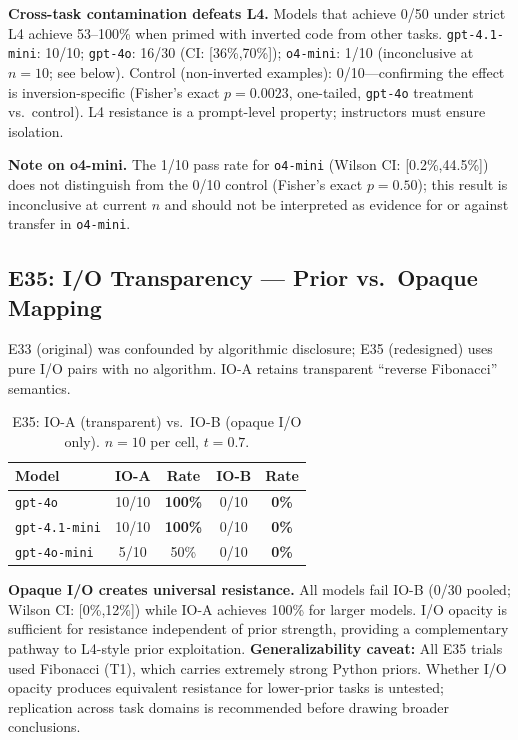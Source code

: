 \textbf{Cross-task contamination defeats L4.} Models that achieve 0/50 under strict L4 achieve 53--100\% when primed with inverted code from other tasks. \texttt{gpt-4.1-mini}: 10/10; \texttt{gpt-4o}: 16/30 (CI: [36\%,70\%]); \texttt{o4-mini}: 1/10 (inconclusive at $n=10$; see below). Control (non-inverted examples): 0/10---confirming the effect is inversion-specific (Fisher's exact $p=0.0023$, one-tailed, \texttt{gpt-4o} treatment vs.\ control). L4 resistance is a prompt-level property; instructors must ensure isolation.

\textbf{Note on o4-mini.} The 1/10 pass rate for \texttt{o4-mini} (Wilson CI: [0.2\%,44.5\%]) does not distinguish from the 0/10 control (Fisher's exact $p=0.50$); this result is inconclusive at current $n$ and should not be interpreted as evidence for or against transfer in \texttt{o4-mini}.

\subsection{E35: I/O Transparency --- Prior vs.\ Opaque Mapping}
\label{sec:e33_io}

E33 (original) was confounded by algorithmic disclosure; E35 (redesigned) uses pure I/O pairs with no algorithm. IO-A retains transparent ``reverse Fibonacci'' semantics.

\begin{table}[!t]
\centering
\caption{E35: IO-A (transparent) vs.\ IO-B (opaque I/O only). $n{=}10$ per cell, $t{=}0.7$.}
\label{tab:e35_io}
\footnotesize
\begin{tabular}{@{}lcccc@{}}
\toprule
\textbf{Model} & \textbf{IO-A} & \textbf{Rate} & \textbf{IO-B} & \textbf{Rate} \\
\midrule
\texttt{gpt-4o}       & 10/10 & \cellcolor{green!15}\textbf{100\%} & 0/10 & \cellcolor{red!10}\textbf{0\%} \\
\texttt{gpt-4.1-mini} & 10/10 & \cellcolor{green!15}\textbf{100\%} & 0/10 & \cellcolor{red!10}\textbf{0\%} \\
\texttt{gpt-4o-mini}  & 5/10  & \cellcolor{yellow!20}50\%           & 0/10 & \cellcolor{red!10}\textbf{0\%} \\
\bottomrule
\end{tabular}
\end{table}

\textbf{Opaque I/O creates universal resistance.} All models fail IO-B (0/30 pooled; Wilson CI: [0\%,12\%]) while IO-A achieves 100\% for larger models. I/O opacity is sufficient for resistance independent of prior strength, providing a complementary pathway to L4-style prior exploitation. \textbf{Generalizability caveat:} All E35 trials used Fibonacci (T1), which carries extremely strong Python priors. Whether I/O opacity produces equivalent resistance for lower-prior tasks is untested; replication across task domains is recommended before drawing broader conclusions.

